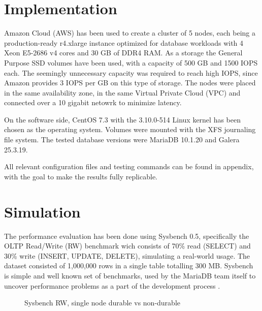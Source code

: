 \documentclass{sig-alternate}
\begin{document}
\section{Implementation}
Amazon Cloud (AWS) has been used to create a cluster of 5 nodes, each being a production-ready r4.xlarge instance optimized for database workloads \cite{awsinstances} with 4 Xeon E5-2686 v4 cores and 30 GB of DDR4 RAM. As a storage the General Purpose SSD volumes have been used, with a capacity of 500 GB and 1500 IOPS each. The seemingly unnecessary capacity was required to reach high IOPS, since Amazon provides 3 IOPS per GB on this type of storage. The nodes were placed in the same availability zone, in the same Virtual Private Cloud (VPC) and connected over a 10 gigabit netowrk to minimize latency.

On the software side, CentOS 7.3 with the 3.10.0-514 Linux kernel has been chosen as the operating system. Volumes were mounted with the XFS journaling file system. The tested database versions were MariaDB 10.1.20 and Galera 25.3.19.

All relevant configuration files and testing commands can be found in appendix, with the goal to make the results fully replicable.

\section{Simulation}

The performance evaluation has been done using Sysbench 0.5, specifically the OLTP Read/Write (RW) benchmark wich consists of 70\% read (SELECT) and 30\% write (INSERT, UPDATE, DELETE), simulating a real-world usage. The dataset consisted of 1,000,000 rows in a single table totalling 300 MB. Sysbench is simple and well known set of benchmarks, used by the MariaDB team itself to uncover performance problems as a part of the development process \cite{mariadbsysbench}.

\begin{figure}[h]
\centering
{}
\caption{Sysbench RW, single node durable vs non-durable}
\end{figure}
\end{document}
